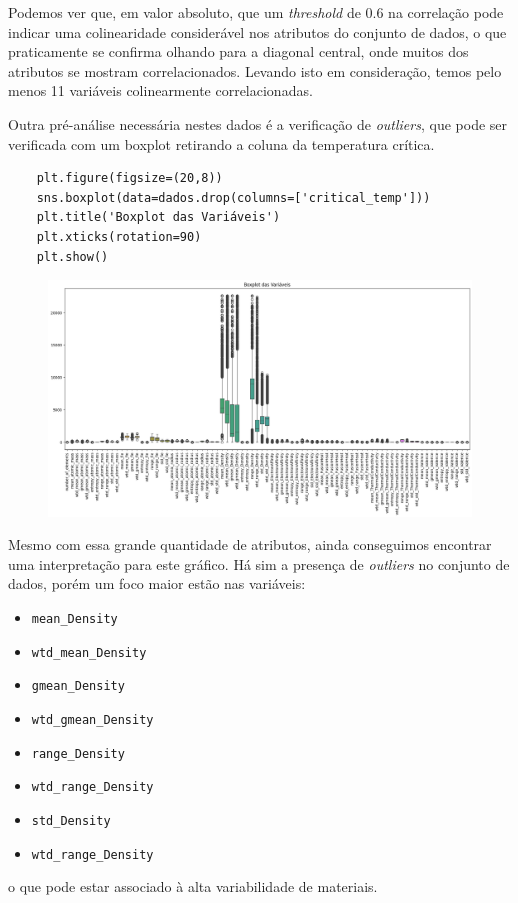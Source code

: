 Podemos ver que, em valor absoluto, que um \textit{threshold} de 0.6 na correlação pode indicar uma colinearidade considerável nos atributos do conjunto de dados, o que praticamente se confirma olhando para a diagonal central, onde muitos dos atributos se mostram correlacionados. Levando isto em consideração, temos pelo menos 11 variáveis colinearmente correlacionadas.

Outra pré-análise necessária nestes dados é a verificação de \textit{outliers}, que pode ser verificada com um boxplot retirando a coluna da temperatura crítica.
\begin{longlisting}
    \begin{verbatim}
    plt.figure(figsize=(20,8))
    sns.boxplot(data=dados.drop(columns=['critical_temp']))
    plt.title('Boxplot das Variáveis')
    plt.xticks(rotation=90)
    plt.show()
    \end{verbatim}
\end{longlisting}
\begin{figure}[H]
    \centering
    \includegraphics[width=\textwidth]{figures/boxplot.png}
\end{figure}

Mesmo com essa grande quantidade de atributos, ainda conseguimos encontrar uma interpretação para este gráfico. Há sim a presença de \textit{outliers} no conjunto de dados, porém um foco maior estão nas variáveis:
\begin{itemize}
    \item \verb|mean_Density|
    \item \verb|wtd_mean_Density|
    \item \verb|gmean_Density|
    \item \verb|wtd_gmean_Density|
    \item \verb|range_Density|
    \item \verb|wtd_range_Density|
    \item \verb|std_Density|
    \item \verb|wtd_range_Density|
\end{itemize}
o que pode estar associado à alta variabilidade de materiais.